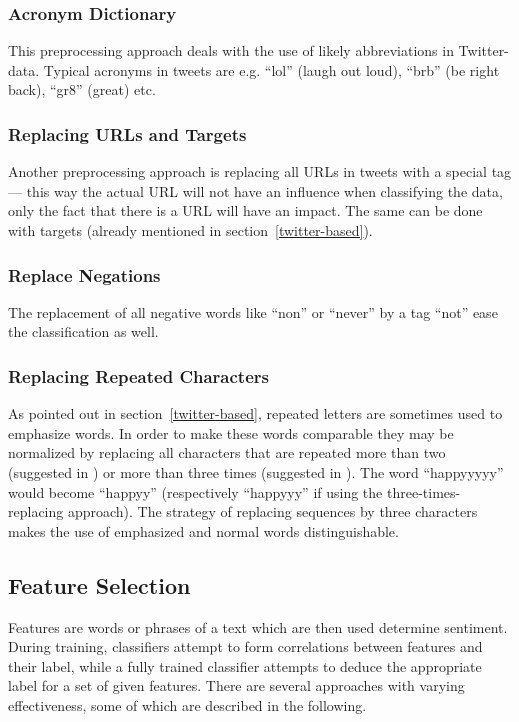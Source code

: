 \documentclass{acm_proc_article-sp}
\begin{document}
\subsubsection{Acronym Dictionary}

This preprocessing approach deals with the
use of likely abbreviations in Twitter-data.  Typical acronyms in tweets are
e.g. ``lol'' (laugh out loud), ``brb'' (be right back), ``gr8'' (great) etc.

\subsubsection{Replacing URLs and Targets}

Another preprocessing approach is
replacing all URLs in tweets with a special tag --- this way the actual URL will
not have an influence when classifying the data, only the fact that there is a
URL will have an impact.  The same can be done with targets (already mentioned
in section~\ref{twitter-based}).

\subsubsection{Replace Negations}

The replacement of all negative words like
``non'' or ``never'' by a tag ``not'' ease the classification as well.

\subsubsection{Replacing Repeated Characters}

As pointed out in
section~\ref{twitter-based}, repeated letters are sometimes used to emphasize words.
In order to make these words comparable they may be normalized
by replacing all characters that are repeated more than two
(suggested in \cite{go2009twitter}) or more than three times (suggested in
\cite{agarwal2011sentiment}). The word  ``happyyyyy'' would become ``happyy''
(respectively ``happyyy'' if using the three-times-replacing approach). The
strategy of replacing sequences by three characters makes the use of emphasized
and normal words distinguishable.

\subsection{Feature Selection}

Features are words or phrases of a text which are then used determine sentiment.
During training, classifiers attempt to form correlations between features and their label,
while a fully trained classifier attempts to deduce the appropriate label for a set
of given features. 
There are several approaches with varying effectiveness,
some of which are described in the following.
\end{document}
